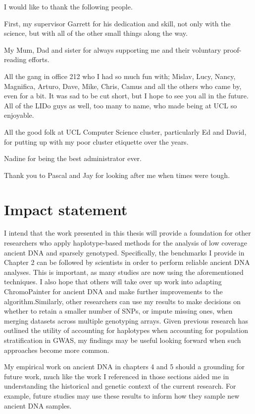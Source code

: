 \begin{acknowledgements}
\noindent
I would like to thank the following people.

\noindent
First, my supervisor Garrett for his dedication and skill, not only with the science, but with all of the other small things along the way. 

\noindent
My Mum, Dad and sister for always supporting me and their voluntary proof-reading efforts.

\noindent
All the gang in office 212 who I had so much fun with; Mislav, Lucy, Nancy, Magnifica, Arturo, Dave, Mike, Chris, Camus and all the others who came by, even for a bit. It was sad to be cut short, but I hope to see you all in the future. All of the LIDo guys as well, too many to name, who made being at UCL so enjoyable. 


\noindent
All the good folk at UCL Computer Science cluster, particularly Ed and David, for putting up with my poor cluster etiquette over the years. 

\noindent
Nadine for being the best administrator ever.

\noindent
Thank you to Pascal and Jay for looking after me when times were tough. 
\end{acknowledgements}


\section{Impact statement}

I intend that the work presented in this thesis will provide a foundation for other researchers who apply haplotype-based methods for the analysis of low coverage ancient DNA and sparsely genotyped. Specifically, the benchmarks I provide in Chapter 2 can be followed by scientists in order to perform reliable ancient DNA analyses. This is important, as many studies are now using the aforementioned techniques. I also hope that others will take over up work into adapting ChromoPainter for ancient DNA and make further improvements to the algorithm.Similarly, other researchers can use my results to make decisions on whether to retain a smaller number of SNPs, or impute missing ones, when merging datasets across multiple genotyping arrays. Given previous research has outlined the utility of accounting for haplotypes when accounting for population stratification in GWAS, my findings may be useful looking forward when such approaches become more common. 

My empirical work on ancient DNA in chapters 4 and 5 should a grounding for future work, much like the work I referenced in those sections aided me in understanding the historical and genetic context of the current research. For example, future studies may use these results to inform how they sample new ancient DNA samples. 

